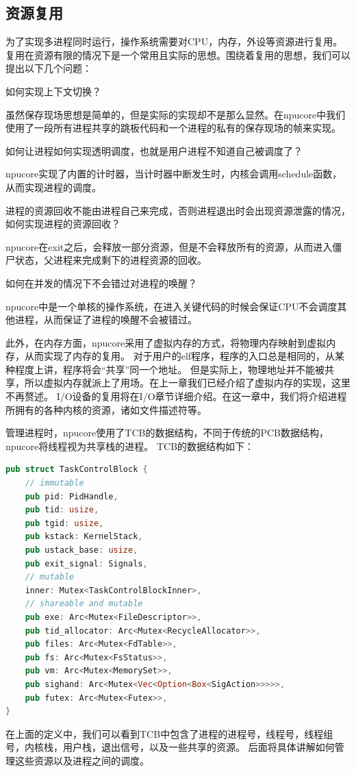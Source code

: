 \subsection{资源复用}
为了实现多进程同时运行，操作系统需要对CPU，内存，外设等资源进行复用。
复用在资源有限的情况下是一个常用且实际的思想。围绕着复用的思想，我们可以提出以下几个问题：

如何实现上下文切换？

虽然保存现场思想是简单的，但是实际的实现却不是那么显然。在npucore中我们使用了一段所有进程共享的跳板代码和一个进程的私有的保存现场的帧来实现。

如何让进程如何实现透明调度，也就是用户进程不知道自己被调度了？

npucore实现了内置的计时器，当计时器中断发生时，内核会调用schedule函数，从而实现进程的调度。

进程的资源回收不能由进程自己来完成，否则进程退出时会出现资源泄露的情况，如何实现进程的资源回收？

npucore在exit之后，会释放一部分资源，但是不会释放所有的资源，从而进入僵尸状态，父进程来完成剩下的进程资源的回收。

如何在并发的情况下不会错过对进程的唤醒？

npucore中是一个单核的操作系统，在进入关键代码的时候会保证CPU不会调度其他进程，从而保证了进程的唤醒不会被错过。

此外，在内存方面，npucore采用了虚拟内存的方式，将物理内存映射到虚拟内存，从而实现了内存的复用。
对于用户的elf程序，程序的入口总是相同的，从某种程度上讲，程序将会“共享”同一个地址。
但是实际上，物理地址并不能被共享，所以虚拟内存就派上了用场。在上一章我们已经介绍了虚拟内存的实现，这里不再赘述。
I/O设备的复用将在I/O章节详细介绍。在这一章中，我们将介绍进程所拥有的各种内核的资源，诸如文件描述符等。

管理进程时，npucore使用了TCB的数据结构，不同于传统的PCB数据结构，npucore将线程视为共享栈的进程。
TCB的数据结构如下：
\begin{lstlisting}[language={Rust}]
pub struct TaskControlBlock {
    // immutable
    pub pid: PidHandle,
    pub tid: usize,
    pub tgid: usize,
    pub kstack: KernelStack,
    pub ustack_base: usize,
    pub exit_signal: Signals,
    // mutable
    inner: Mutex<TaskControlBlockInner>,
    // shareable and mutable
    pub exe: Arc<Mutex<FileDescriptor>>,
    pub tid_allocator: Arc<Mutex<RecycleAllocator>>,
    pub files: Arc<Mutex<FdTable>>,
    pub fs: Arc<Mutex<FsStatus>>,
    pub vm: Arc<Mutex<MemorySet>>,
    pub sighand: Arc<Mutex<Vec<Option<Box<SigAction>>>>>,
    pub futex: Arc<Mutex<Futex>>,
}
\end{lstlisting}
在上面的定义中，我们可以看到TCB中包含了进程的进程号，线程号，线程组号，内核栈，用户栈，退出信号，以及一些共享的资源。
后面将具体讲解如何管理这些资源以及进程之间的调度。